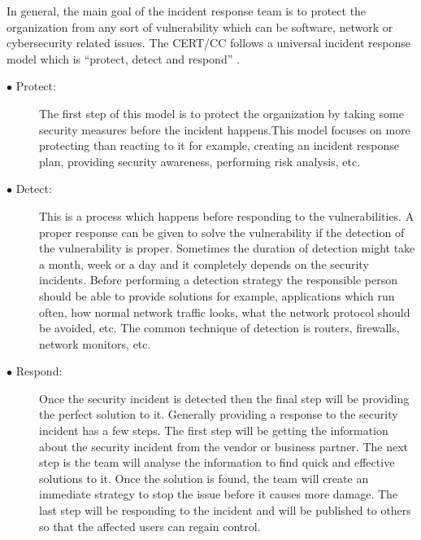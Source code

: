 In general, the main goal of the incident response team is to protect the organization from any sort of vulnerability which can be software, network or cybersecurity related issues. The \acs{CERT/CC} follows a universal incident response model which is “protect, detect and respond” \cite{DiWhGo2004}.
\begin{description}
	\item [$\bullet$ Protect:] The first step of this model is to protect the organization by taking some security measures before the incident happens.This model focuses on more protecting than reacting to it for example, creating an incident response plan, providing security awareness, performing risk analysis, etc.
	
	\item [$\bullet$ Detect:] This is a process which happens before responding to the vulnerabilities. A proper response can be given to solve the vulnerability if the detection of the vulnerability is proper. Sometimes the duration of detection might take a month, week or a day and it completely depends on the security incidents. Before performing a detection strategy the responsible person should be able to provide solutions for example, applications which run often, how normal network traffic looks, what the network protocol should be avoided, etc. The common technique of detection is routers, firewalls, network monitors, etc.
	
	\item [$\bullet$ Respond:] Once the security incident is detected then the final step will be providing the perfect solution to it. Generally providing a response to the security incident has a few steps. The first step will be getting the information about the security incident from the vendor or business partner. The next step is the team will analyse the information to find quick and effective solutions to it. Once the solution is found, the team will create an immediate strategy to stop the issue before it causes more damage. The last step will be responding to the incident and will be published to others so that the affected users can regain control.
\end{description}

